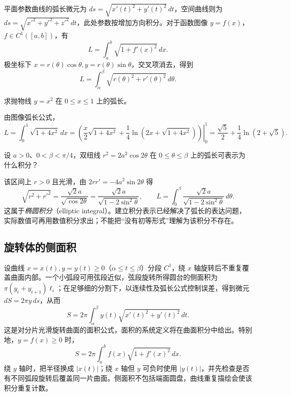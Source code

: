 \documentclass[UTF8,12pt,a4paper,fontset=fandol]{ctexbook}
\begin{document}
平面参数曲线的弧长微元为 $ds=\sqrt{x'(t)^2+y'(t)^2}\,dt$，空间曲线则为 $ds=\sqrt{x'^2+y'^2+z'^2}\,dt$，此处参数按增加方向积分。对于函数图像 $y=f(x)$，$f\in C^1([a,b])$，有
\[
    L=\int_a^b\sqrt{1+f'(x)^2}\,dx.
\]
极坐标下 $x=r(\theta)\cos\theta,y=r(\theta)\sin\theta$，交叉项消去，得到
\begin{equation}
    L=\int_\alpha^\beta\sqrt{r(\theta)^2+r'(\theta)^2}\,d\theta.
    \label{eq:polar-arc-length}
\end{equation}

\begin{example}
\label{ex:parabola-arc-length}
求抛物线 $y=x^2$ 在 $0\leq x\leq1$ 上的弧长。
\end{example}
\begin{solve}
由图像弧长公式，
\[
    L=\int_0^1\sqrt{1+4x^2}\,dx
    =\left.\left(\frac{x}{2}\sqrt{1+4x^2}
       +\frac14\ln(2x+\sqrt{1+4x^2})\right)\right|_0^1
    =\frac{\sqrt5}{2}+\frac14\ln(2+\sqrt5).
\]
\end{solve}

\begin{example}
\label{ex:lemniscate-elliptic-arc-length}
设 $a>0$、$0<\beta<\pi/4$，双纽线 $r^2=2a^2\cos2\theta$ 在 $0\leq\theta\leq\beta$ 上的弧长可表示为什么积分？
\end{example}
\begin{solve}
该区间上 $r>0$ 且光滑，由 $2rr'=-4a^2\sin2\theta$ 得
\[
    \sqrt{r^2+r'^2}
    =\frac{\sqrt2a}{\sqrt{\cos2\theta}}
    =\frac{\sqrt2a}{\sqrt{1-2\sin^2\theta}},
    \qquad
    L=\int_0^\beta\frac{\sqrt2a}{\sqrt{1-2\sin^2\theta}}\,d\theta.
\]
这属于\emph{椭圆积分}（elliptic integral）。建立积分表示已经解决了弧长的表达问题，实际数值可再用数值积分求出；不能把“没有初等形式”理解为该积分不存在。
\end{solve}

\subsection{旋转体的侧面积}
\label{subsec:lateral-areas-of-solids-of-revolution}

设曲线 $x=x(t),y=y(t)\geq0$（$\alpha\leq t\leq\beta$）分段 $C^1$，绕 $x$ 轴旋转后不重复覆盖曲面内部。一个小弧段可用弦段近似，弦段旋转所得圆台的侧面积为 $\pi(y_i+y_{i+1})\ell_i$；在足够细的分割下，以连续性及弧长公式控制误差，得到微元 $dS=2\pi y\,ds$，从而
\begin{equation}
    S=2\pi\int_\alpha^\beta
      y(t)\sqrt{x'(t)^2+y'(t)^2}\,dt.
    \label{eq:surface-of-revolution-area}
\end{equation}
这是对分片光滑旋转曲面的面积公式，面积的系统定义将在曲面积分中给出。特别地，$y=f(x)\geq0$ 时，
\[
    S=2\pi\int_a^b f(x)\sqrt{1+f'(x)^2}\,dx.
\]
绕 $y$ 轴时，把半径换成 $|x(t)|$；绕 $x$ 轴但 $y$ 可负时使用 $|y(t)|$，并先检查是否有不同弧段旋转后覆盖同一片曲面。侧面积不包括端面圆盘，曲线重复描绘会使该积分重复计数。
\end{document}
